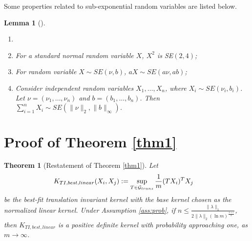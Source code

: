 \documentclass{article}
\theoremstyle{plain}
\newtheorem{theorem}{Theorem}
\newtheorem{lemma}{Lemma}
\theoremstyle{definition}
\theoremstyle{remark}
\begin{document}
Some properties related to sub-exponential random variables are listed below.
\begin{lemma}[\cite{wainwright2019high}] \label{lem:sub-exp-related}
\begin{enumerate} 
    \item[]
    \item For a standard normal random variable $X$, $X^2$ is SE$(2, 4)$;
    \item For random variable $X \sim SE(\nu, b)$, $a X \sim SE(a \nu, ab)$;
    \item Consider independent random variables $X_{1}, \ldots, X_{n}$, where $X_i \sim SE(\nu_i, b_i)$. Let $\nu = (\nu_1, \ldots, \nu_n)$ and $b = (b_1, \ldots, b_n)$. Then $\sum_{i=1}^n X_{i} \sim SE(\|\nu\|_2, \|b\|_\infty)$.
\end{enumerate}
\end{lemma}



\section{Proof of Theorem \ref{thm1}}
\label{sec:app_thm1}
\begin{theorem}[Restatement of Theorem \ref{thm1}] 
\label{thm1_appendix}
Let 
\begin{align*}
K_{TI,best,linear}(X_i,X_j) &:= \sup_{T \in {\cal{G}}_{trans}} \frac{1}{m} (TX_i)^T X_j
\end{align*}
be the best-fit translation invariant kernel with the base kernel chosen as the normalized linear kernel. Under Assumption \ref{ass:prob}, if $n \leq \frac{\|\lambda\|_1}{2\|\lambda\|_2 (\ln m)^{\frac{1+\epsilon}{2}}}$, then $K_{TI,best,linear}$ is a positive definite kernel with probability approaching one, as $m \to \infty$.   
\end{theorem}
\end{document}
